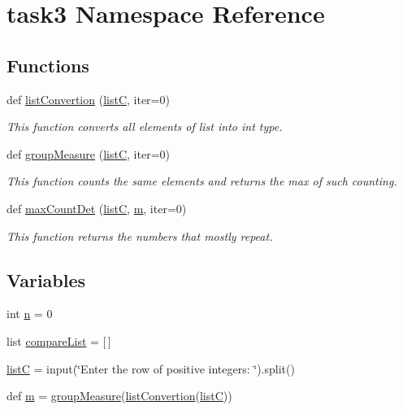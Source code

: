 \hypertarget{namespacetask3}{}\section{task3 Namespace Reference}
\label{namespacetask3}
\subsection*{Functions}
\begin{DoxyCompactItemize}
\item 
def \hyperlink{namespacetask3_abba7e8af5c5248ae896e372877accedc}{list\+Convertion} (\hyperlink{namespacetask3_a3318227cad6d17b510fe2bf8cf087ddd}{listC}, iter=0)
\begin{DoxyCompactList}\small\item\em This function converts all elements of list into int type. \end{DoxyCompactList}\item 
def \hyperlink{namespacetask3_a6b40d0f4ac3da0b51afd77ef157756b4}{group\+Measure} (\hyperlink{namespacetask3_a3318227cad6d17b510fe2bf8cf087ddd}{listC}, iter=0)
\begin{DoxyCompactList}\small\item\em This function counts the same elements and returns the max of such counting. \end{DoxyCompactList}\item 
def \hyperlink{namespacetask3_a59c205e4cf87f8cc7c2c1e6bb5d6d318}{max\+Count\+Det} (\hyperlink{namespacetask3_a3318227cad6d17b510fe2bf8cf087ddd}{listC}, \hyperlink{namespacetask3_ac93936462cbd3bcd1b57b0770e3e565f}{m}, iter=0)
\begin{DoxyCompactList}\small\item\em This function returns the numbers that mostly repeat. \end{DoxyCompactList}\end{DoxyCompactItemize}
\subsection*{Variables}
\begin{DoxyCompactItemize}
\item 
int \hyperlink{namespacetask3_ad2c2b323bd5691b0b9b284d8d7d7cbd1}{n} = 0
\item 
list \hyperlink{namespacetask3_a1e4a75eeab9e370f61b2d4a2335f8fc3}{compare\+List} = \mbox{[}$\,$\mbox{]}
\item 
\hyperlink{namespacetask3_a3318227cad6d17b510fe2bf8cf087ddd}{listC} = input(\char`\"{}Enter the row of positive integers\+: \char`\"{}).split()
\item 
def \hyperlink{namespacetask3_ac93936462cbd3bcd1b57b0770e3e565f}{m} = \hyperlink{namespacetask3_a6b40d0f4ac3da0b51afd77ef157756b4}{group\+Measure}(\hyperlink{namespacetask3_abba7e8af5c5248ae896e372877accedc}{list\+Convertion}(\hyperlink{namespacetask3_a3318227cad6d17b510fe2bf8cf087ddd}{listC}))
\end{DoxyCompactItemize}


